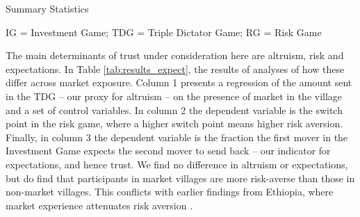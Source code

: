 
\begin{threeparttable}[htb]
	\caption{Summary Statistics}
	\label{tab:summ_stats}
	\centering
	
	\begin{tablenotes}
		\item IG = Investment Game; TDG = Triple Dictator Game; RG = Risk Game
		\item
	\end{tablenotes}

\end{threeparttable}




The main determinants of trust under consideration here are altruism, risk and expectations. In Table \ref{tab:results_expect}, the results of analyses of how these differ across market exposure. Column 1 presents a regression of the amount sent in the TDG -- our proxy for altruism -- on the presence of market in the village and a set of control variables. In column 2 the dependent variable is the switch point in the risk game, where a higher switch point means higher risk aversion. Finally, in column 3 the dependent variable is the fraction the first mover in the Investment Game expects the second mover to send back -- our indicator for expectations, and hence trust.  We find no difference in altruism or expectations, but do find that participants in market villages are more risk-averse than those in non-market villages. This conflicts with earlier findings from Ethiopia, where market experience attenuates risk aversion \citep{Melesse2015}.

